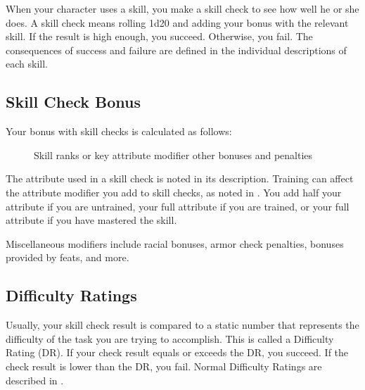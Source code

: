     When your character uses a skill, you make a skill check to see how well he or she does. A skill check means rolling 1d20 and adding your bonus with the relevant skill. If the result is high enough, you succeed. Otherwise, you fail. The consequences of success and failure are defined in the individual descriptions of each skill.

    \subsection{Skill Check Bonus}

        Your bonus with skill checks is calculated as follows:

        \begin{figure}[h]
            \centering Skill ranks or key attribute modifier \add other bonuses and penalties
        \end{figure}

         The attribute used in a skill check is noted in its description.
        Training can affect the attribute modifier you add to skill checks, as noted in .
        You add half your attribute if you are untrained, your full attribute if you are trained, or your full attribute  if you have mastered the skill.

         Miscellaneous modifiers include racial bonuses, armor check penalties, bonuses provided by feats, and more.

    \subsection{Difficulty Ratings}

        Usually, your skill check result is compared to a static number that represents the difficulty of the task you are trying to accomplish.
        This is called a Difficulty Rating (DR).
        If your check result equals or exceeds the DR, you succeed.
        If the check result is lower than the DR, you fail.
        Normal Difficulty Ratings are described in .

